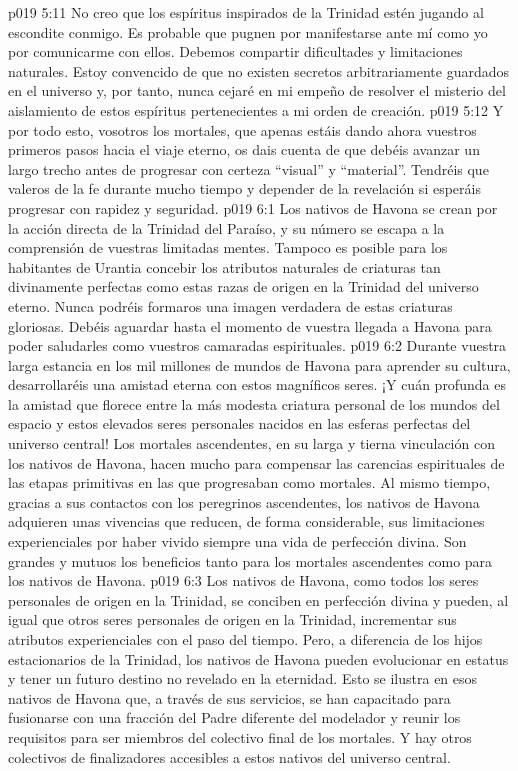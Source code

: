 \vs p019 5:11 No creo que los espíritus inspirados de la Trinidad estén jugando al escondite conmigo. Es probable que pugnen por manifestarse ante mí como yo por comunicarme con ellos. Debemos compartir dificultades y limitaciones naturales. Estoy convencido de que no existen secretos arbitrariamente guardados en el universo y, por tanto, nunca cejaré en mi empeño de resolver el misterio del aislamiento de estos espíritus pertenecientes a mi orden de creación.
\vs p019 5:12 Y por todo esto, vosotros los mortales, que apenas estáis dando ahora vuestros primeros pasos hacia el viaje eterno, os dais cuenta de que debéis avanzar un largo trecho antes de progresar con certeza “visual” y “material”. Tendréis que valeros de la fe durante mucho tiempo y depender de la revelación si esperáis progresar con rapidez y seguridad.
\vs p019 6:1 Los nativos de Havona se crean por la acción directa de la Trinidad del Paraíso, y su número se escapa a la comprensión de vuestras limitadas mentes. Tampoco es posible para los habitantes de Urantia concebir los atributos naturales de criaturas tan divinamente perfectas como estas razas de origen en la Trinidad del universo eterno. Nunca podréis formaros una imagen verdadera de estas criaturas gloriosas. Debéis aguardar hasta el momento de vuestra llegada a Havona para poder saludarles como vuestros camaradas espirituales.
\vs p019 6:2 Durante vuestra larga estancia en los mil millones de mundos de Havona para aprender su cultura, desarrollaréis una amistad eterna con estos magníficos seres. ¡Y cuán profunda es la amistad que florece entre la más modesta criatura personal de los mundos del espacio y estos elevados seres personales nacidos en las esferas perfectas del universo central! Los mortales ascendentes, en su larga y tierna vinculación con los nativos de Havona, hacen mucho para compensar las carencias espirituales de las etapas primitivas en las que progresaban como mortales. Al mismo tiempo, gracias a sus contactos con los peregrinos ascendentes, los nativos de Havona adquieren unas vivencias que reducen, de forma considerable, sus limitaciones experienciales por haber vivido siempre una vida de perfección divina. Son grandes y mutuos los beneficios tanto para los mortales ascendentes como para los nativos de Havona.
\vs p019 6:3 \pc Los nativos de Havona, como todos los seres personales de origen en la Trinidad, se conciben en perfección divina y pueden, al igual que otros seres personales de origen en la Trinidad, incrementar sus atributos experienciales con el paso del tiempo. Pero, a diferencia de los hijos estacionarios de la Trinidad, los nativos de Havona pueden evolucionar en estatus y tener un futuro destino no revelado en la eternidad. Esto se ilustra en esos nativos de Havona que, a través de sus servicios, se han capacitado para fusionarse con una fracción del Padre diferente del modelador y reunir los requisitos para ser miembros del colectivo final de los mortales. Y hay otros colectivos de finalizadores accesibles a estos nativos del universo central.
